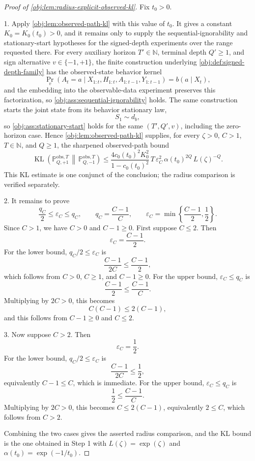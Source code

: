 \begin{proof}[Proof of \cref{obj:lem:radius-explicit-observed-kl}]
Fix \(t_0>0\).

1.  Apply \cref{obj:lem:observed-path-kl} with this value of \(t_0\).  It gives a constant \(K_0=K_0(t_0)>0\), and it remains only to supply the sequential-ignorability and stationary-start hypotheses for the signed-depth experiments over the range requested there.  For every auxiliary horizon \(T'\in\mathbb N\), terminal depth \(Q'\ge1\), and sign alternative \(v\in\{-1,+1\}\), the finite construction underlying \cref{obj:def:signed-depth-family} has the observed-state behavior kernel
\[
\Pr_v\!\left(A_t=a\mid X_{1:t},H_{1:t},A_{1:t-1},Y_{1:t-1}\right)=b(a\mid X_t),
\]
and the embedding into the observable-data experiment preserves this factorization, so \cref{obj:ass:sequential-ignorability} holds.  The same construction starts the joint state from its behavior stationary law,
\[
S_1\sim d_b,
\]
so \cref{obj:ass:stationary-start} holds for the same \((T',Q',v)\), including the zero-horizon case.  Hence \cref{obj:lem:observed-path-kl} supplies, for every \(\zeta>0\), \(C>1\), \(T\in\mathbb N\), and \(Q\ge1\), the sharpened observed-path bound
\[
\operatorname{KL}\!\left(
\mathbb P_{Q,+1}^{\mathrm{obs},T}\,\middle\|\,
\mathbb P_{Q,-1}^{\mathrm{obs},T}
\right)
\le
\frac{4c_0(t_0)^2K_0^2}{1-c_0(t_0)^2}\,
T\,\varepsilon_C^2\,\alpha(t_0)^{2Q}\,L(\zeta)^{-Q}.
\]
This KL estimate is one conjunct of the conclusion; the radius comparison is verified separately. %

2.  It remains to prove
\[
\frac{q_C}{2}\le \varepsilon_C\le q_C,
\qquad
q_C=\frac{C-1}{C},
\qquad
\varepsilon_C=\min\left\{\frac{C-1}{2},\frac12\right\}.
\]
Since \(C>1\), we have \(C>0\) and \(C-1\ge0\).  First suppose \(C\le2\).  Then
\[
\varepsilon_C=\frac{C-1}{2}.
\]
For the lower bound, \(q_C/2\le\varepsilon_C\) is
\[
\frac{C-1}{2C}\le\frac{C-1}{2},
\]
which follows from \(C>0\), \(C\ge1\), and \(C-1\ge0\).  For the upper bound, \(\varepsilon_C\le q_C\) is
\[
\frac{C-1}{2}\le\frac{C-1}{C}.
\]
Multiplying by \(2C>0\), this becomes
\[
C(C-1)\le2(C-1),
\]
and this follows from \(C-1\ge0\) and \(C\le2\). %

3.  Now suppose \(C>2\).  Then
\[
\varepsilon_C=\frac12.
\]
For the lower bound, \(q_C/2\le\varepsilon_C\) is
\[
\frac{C-1}{2C}\le\frac12,
\]
equivalently \(C-1\le C\), which is immediate.  For the upper bound, \(\varepsilon_C\le q_C\) is
\[
\frac12\le\frac{C-1}{C}.
\]
Multiplying by \(2C>0\), this becomes \(C\le2(C-1)\), equivalently \(2\le C\), which follows from \(C>2\). %

Combining the two cases gives the asserted radius comparison, and the KL bound is the one obtained in Step 1 with \(L(\zeta)=\exp(\zeta)\) and \(\alpha(t_0)=\exp(-1/t_0)\). %
\end{proof}
